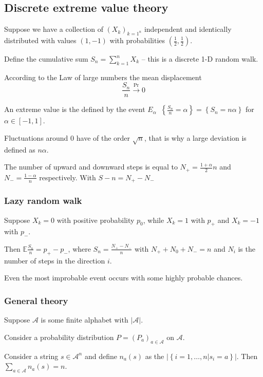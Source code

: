 \documentclass[a4paper]{article}
\newcommand{\obj}[1]{{\left\{ #1 \right \}}}
\newcommand{\clo}[1]{{\left [ #1 \right ]}}
\newcommand{\brac}[1]{{\left ( #1 \right )}}
\newcommand{\induc}[1]{{\left . #1 \right \vert}}
\newcommand{\abs}[1]{{\left | #1 \right |}}
\newcommand{\Acal}{\mathcal{A}}
\newcommand{\ex}{\mathbb{E}}
\newcommand{\defn}{\mathop{\overset{\Delta}{=}}\nolimits}
\begin{document}
\subsection{Discrete extreme value theory} %
\label{sub:discrete_extreme_value_theory}
Suppose we have a collection of $\brac{X_k}_{k=1^n}$ independent and identically distributed with values $\brac{1, -1}$ with probabilities $\brac{\frac{1}{2},\frac{1}{2}}$.

Define the cumulative sum $S_n = \sum_{k=1}^n X_k$ -- this is a discrete 1-D random walk.

According to the Law of large numbers the mean displacement 
\[\frac{S_n}{n} \overset{\Pr}{\to} 0\]

An extreme value is the defined by the event $E_\alpha \defn \obj{ \frac{S_n}{n} = \alpha } = \obj{ S_n = n\alpha }$ for $\alpha\in \clo{-1,1}$.

Fluctuations around $0$ have of the order $\sqrt{n}$, that is why a large deviation is defined as $n\alpha$.

The number of upward and downward steps is equal to $N_+ = \frac{1+\alpha}{2}n$ and $N_- = \frac{1-\alpha}{n}$ respectively. With $S-n = N_+-N_-$

\subsubsection{Lazy random walk} %
\label{ssub:lazy_random_walk}

Suppose $X_k = 0$ with positive probability $p_0$, while $X_k = 1$ with $p_+$ and $X_k=-1$ with $p_-$. 

Then $\ex \frac{S_n}{n} = p_+ - p_-$, where $S_n = \frac{N_+-N_-}{n}$ with $N_++N_0+N_- = n$ and $N_i$ is the number of steps in the direction $i$.

Even the most improbable event occurs with some highly probable chances.


\subsubsection{General theory} %
\label{ssub:general_theory}

Suppose $\Acal$ is some finite alphabet with $\abs{\Acal}$.

Consider a probability distribution $P = \brac{P_a}_{a\in \Acal}$ on $\Acal$.

Consider a string $s\in \Acal^n$ and define $n_a(s)$  as the $\abs{\obj{\induc{i=1,\ldots,n} s_i = a }}$. Then $\sum_{a\in\Acal} n_a(s) = n$.
\end{document}

